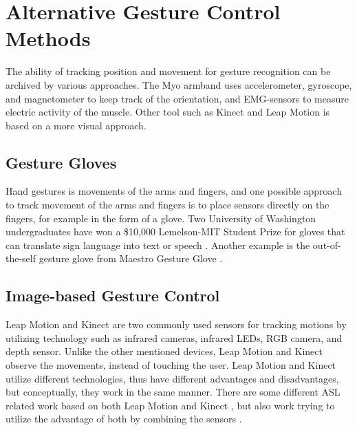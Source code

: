 \section{Alternative Gesture Control Methods}
The ability of tracking position and movement for gesture recognition can be archived by various approaches. The Myo armband uses accelerometer, gyroscope, and magnetometer to keep track of the orientation, and EMG-sensors to measure electric activity of the muscle. Other tool such as Kinect and Leap Motion is based on a more visual approach. 

\subsection{Gesture Gloves}
Hand gestures is movements of the arms and fingers, and one possible approach to track movement of the arms and fingers is to place sensors directly on the fingers, for example in the form of a glove. Two University of Washington undergraduates have won a \$10,000 Lemelson-MIT Student Prize for gloves that can translate sign language into text or speech \cite{uw:SignAloud}. Another example is the out-of-the-self gesture glove from Maestro Gesture Glove \cite{maestroglove}.

\subsection{Image-based Gesture Control}
Leap Motion \cite{leap_motion} and Kinect \cite{kinect} are two commonly used sensors for tracking motions by utilizing technology such as infrared cameras, infrared LEDs, RGB camera, and depth sensor. Unlike the other mentioned devices, Leap Motion and Kinect observe the movements, instead of touching the user. Leap Motion and Kinect utilize different technologies, thus have different advantages and disadvantages, but conceptually, they work in the same manner. There are some different ASL related work based on both Leap Motion \cite{potter2013leap,chuan2014american} and Kinect \cite{zafrulla2011american,lang2012sign,chai2013sign}, but also work trying to utilize the advantage of both by combining the sensors \cite{marin2014hand}.